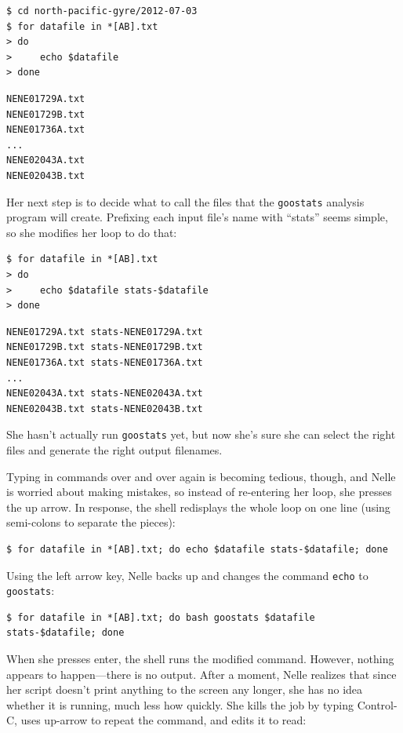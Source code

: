 \documentclass[]{book}
\begin{document}
\begin{verbatim}
$ cd north-pacific-gyre/2012-07-03
$ for datafile in *[AB].txt
> do
>     echo $datafile
> done
\end{verbatim}

\begin{verbatim}
NENE01729A.txt
NENE01729B.txt
NENE01736A.txt
...
NENE02043A.txt
NENE02043B.txt
\end{verbatim}

Her next step is to decide what to call the files that the
\texttt{goostats} analysis program will create. Prefixing each input
file's name with ``stats'' seems simple, so she modifies her loop to do
that:

\begin{verbatim}
$ for datafile in *[AB].txt
> do
>     echo $datafile stats-$datafile
> done
\end{verbatim}

\begin{verbatim}
NENE01729A.txt stats-NENE01729A.txt
NENE01729B.txt stats-NENE01729B.txt
NENE01736A.txt stats-NENE01736A.txt
...
NENE02043A.txt stats-NENE02043A.txt
NENE02043B.txt stats-NENE02043B.txt
\end{verbatim}

She hasn't actually run \texttt{goostats} yet, but now she's sure she
can select the right files and generate the right output filenames.

Typing in commands over and over again is becoming tedious, though, and
Nelle is worried about making mistakes, so instead of re-entering her
loop, she presses the up arrow. In response, the shell redisplays the
whole loop on one line (using semi-colons to separate the pieces):

\begin{verbatim}
$ for datafile in *[AB].txt; do echo $datafile stats-$datafile; done
\end{verbatim}

Using the left arrow key, Nelle backs up and changes the command
\texttt{echo} to \texttt{goostats}:

\begin{verbatim}
$ for datafile in *[AB].txt; do bash goostats $datafile stats-$datafile; done
\end{verbatim}

When she presses enter, the shell runs the modified command. However,
nothing appears to happen---there is no output. After a moment, Nelle
realizes that since her script doesn't print anything to the screen any
longer, she has no idea whether it is running, much less how quickly.
She kills the job by typing Control-C, uses up-arrow to repeat the
command, and edits it to read:
\end{document}
